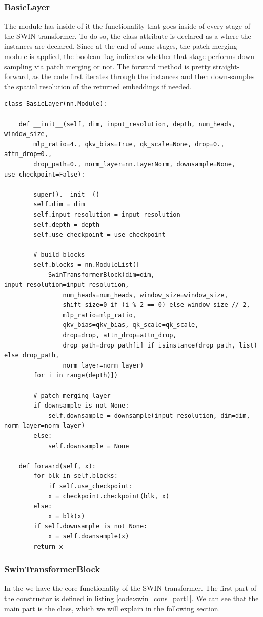 \subsubsection{BasicLayer}
The  module has inside of it the functionality that goes inside of every stage of the SWIN transformer. To do so, the class attribute  is declared as a  where the  instances are declared. Since at the end of some stages, the patch merging module is applied, the  boolean flag indicates whether that stage performs down-sampling via patch merging or not. The forward method is pretty straight-forward, as the code first iterates through the   instances and then down-samples the spatial resolution of the returned embeddings if needed.

\begin{lstlisting}
class BasicLayer(nn.Module):

	def __init__(self, dim, input_resolution, depth, num_heads, window_size,
		mlp_ratio=4., qkv_bias=True, qk_scale=None, drop=0., attn_drop=0.,
		drop_path=0., norm_layer=nn.LayerNorm, downsample=None, use_checkpoint=False):
		
		super().__init__()
		self.dim = dim
		self.input_resolution = input_resolution
		self.depth = depth
		self.use_checkpoint = use_checkpoint
		
		# build blocks
		self.blocks = nn.ModuleList([
			SwinTransformerBlock(dim=dim, input_resolution=input_resolution,
				num_heads=num_heads, window_size=window_size,
				shift_size=0 if (i % 2 == 0) else window_size // 2,
				mlp_ratio=mlp_ratio,
				qkv_bias=qkv_bias, qk_scale=qk_scale,
				drop=drop, attn_drop=attn_drop,
				drop_path=drop_path[i] if isinstance(drop_path, list) else drop_path,
				norm_layer=norm_layer)
		for i in range(depth)])
		
		# patch merging layer
		if downsample is not None:
			self.downsample = downsample(input_resolution, dim=dim, norm_layer=norm_layer)
		else:
			self.downsample = None
	
	def forward(self, x):
		for blk in self.blocks:
			if self.use_checkpoint:
			x = checkpoint.checkpoint(blk, x)
		else:
			x = blk(x)
		if self.downsample is not None:
			x = self.downsample(x)
		return x
\end{lstlisting}

\subsubsection{SwinTransformerBlock}
In the  we have the core functionality of the SWIN transformer. The first part of the constructor is defined in listing \ref{code:swin_cons_part1}. We can see that the main part is the  class, which we will explain in the following section.

